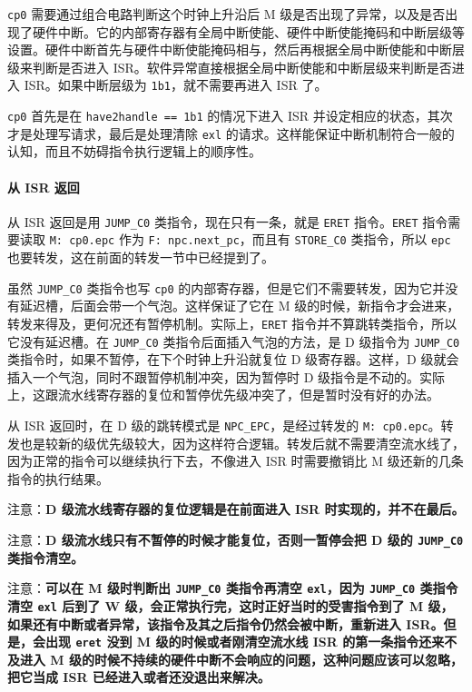 \documentclass[12pt,AutoFakeBold,AutoFakeSlant]{article}
\begin{document}
\texttt{cp0} 需要通过组合电路判断这个时钟上升沿后 M
级是否出现了异常，以及是否出现了硬件中断。它的内部寄存器有全局中断使能、硬件中断使能掩码和中断层级等设置。硬件中断首先与硬件中断使能掩码相与，然后再根据全局中断使能和中断层级来判断是否进入
ISR。软件异常直接根据全局中断使能和中断层级来判断是否进入
ISR。如果中断层级为 \texttt{1\textquotesingle{}b1}，就不需要再进入 ISR
了。

\texttt{cp0} 首先是在 \texttt{have2handle\ ==\ 1\textquotesingle{}b1}
的情况下进入 ISR 并设定相应的状态，其次才是处理写请求，最后是处理清除
\texttt{exl}
的请求。这样能保证中断机制符合一般的认知，而且不妨碍指令执行逻辑上的顺序性。

\hypertarget{ux4ece-isr-ux8fd4ux56de}{%
\paragraph{从 ISR 返回}\label{ux4ece-isr-ux8fd4ux56de}}

从 ISR 返回是用 \texttt{JUMP\_C0} 类指令，现在只有一条，就是
\texttt{ERET} 指令。\texttt{ERET} 指令需要读取 \texttt{M:\ cp0.epc} 作为
\texttt{F:\ npc.next\_pc}，而且有 \texttt{STORE\_C0} 类指令，所以
\texttt{epc} 也要转发，这在前面的转发一节中已经提到了。

虽然 \texttt{JUMP\_C0} 类指令也写 \texttt{cp0}
的内部寄存器，但是它们不需要转发，因为它并没有延迟槽，后面会带一个气泡。这样保证了它在
M
级的时候，新指令才会进来，转发来得及，更何况还有暂停机制。实际上，\texttt{ERET}
指令并不算跳转类指令，所以它没有延迟槽。在 \texttt{JUMP\_C0}
类指令后面插入气泡的方法，是 D 级指令为 \texttt{JUMP\_C0}
类指令时，如果不暂停，在下个时钟上升沿就复位 D 级寄存器。这样，D
级就会插入一个气泡，同时不跟暂停机制冲突，因为暂停时 D
级指令是不动的。实际上，这跟流水线寄存器的复位和暂停优先级冲突了，但是暂时没有好的办法。

从 ISR 返回时，在 D 级的跳转模式是 \texttt{NPC\_EPC}，是经过转发的
\texttt{M:\ cp0.epc}。转发也是较新的级优先级较大，因为这样符合逻辑。转发后就不需要清空流水线了，因为正常的指令可以继续执行下去，不像进入
ISR 时需要撤销比 M 级还新的几条指令的执行结果。

注意：\textbf{D 级流水线寄存器的复位逻辑是在前面进入 ISR
时实现的，并不在最后。}

注意：\textbf{D 级流水线只有不暂停的时候才能复位，否则一暂停会把 D 级的
\texttt{JUMP\_C0} 类指令清空。}

注意：\textbf{可以在 M 级时判断出 \texttt{JUMP\_C0} 类指令再清空
\texttt{exl}，因为 \texttt{JUMP\_C0} 类指令清空 \texttt{exl} 后到了 W
级，会正常执行完，这时正好当时的受害指令到了 M
级，如果还有中断或者异常，该指令及其之后指令仍然会被中断，重新进入
ISR。但是，会出现 \texttt{eret} 没到 M 级的时候或者刚清空流水线 ISR
的第一条指令还来不及进入 M
级的时候不持续的硬件中断不会响应的问题，这种问题应该可以忽略，把它当成
ISR 已经进入或者还没退出来解决。}
\end{document}
